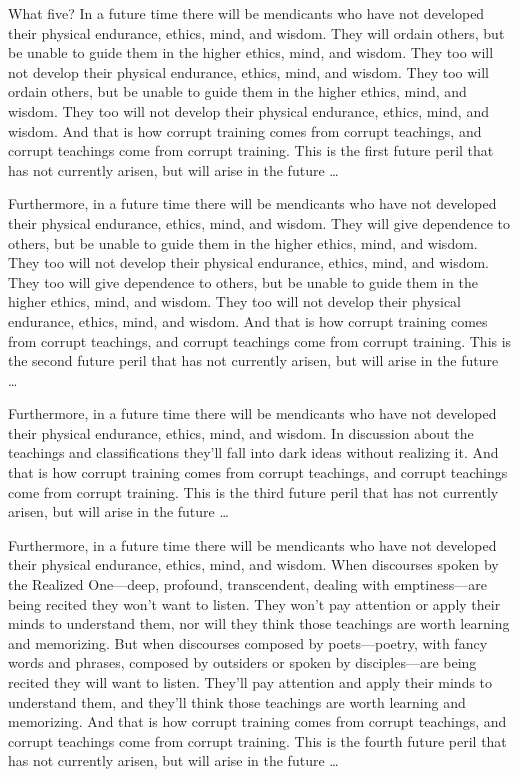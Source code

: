 \documentclass[12pt,openany]{book}%
\begin{document}
What five? In a future time there will be mendicants who have not developed their physical endurance, ethics, mind, and wisdom. They will ordain others, but be unable to guide them in the higher ethics, mind, and wisdom. They too will not develop their physical endurance, ethics, mind, and wisdom. They too will ordain others, but be unable to guide them in the higher ethics, mind, and wisdom. They too will not develop their physical endurance, ethics, mind, and wisdom. And that is how corrupt training comes from corrupt teachings, and corrupt teachings come from corrupt training. This is the first future peril that has not currently arisen, but will arise in the future … 

Furthermore, in a future time there will be mendicants who have not developed their physical endurance, ethics, mind, and wisdom. They will give dependence to others, but be unable to guide them in the higher ethics, mind, and wisdom. They too will not develop their physical endurance, ethics, mind, and wisdom. They too will give dependence to others, but be unable to guide them in the higher ethics, mind, and wisdom. They too will not develop their physical endurance, ethics, mind, and wisdom. And that is how corrupt training comes from corrupt teachings, and corrupt teachings come from corrupt training. This is the second future peril that has not currently arisen, but will arise in the future … 

Furthermore, in a future time there will be mendicants who have not developed their physical endurance, ethics, mind, and wisdom. In discussion about the teachings and classifications they’ll fall into dark ideas without realizing it. And that is how corrupt training comes from corrupt teachings, and corrupt teachings come from corrupt training. This is the third future peril that has not currently arisen, but will arise in the future … 

Furthermore, in a future time there will be mendicants who have not developed their physical endurance, ethics, mind, and wisdom. When discourses spoken by the Realized One—deep, profound, transcendent, dealing with emptiness—are being recited they won’t want to listen. They won’t pay attention or apply their minds to understand them, nor will they think those teachings are worth learning and memorizing. But when discourses composed by poets—poetry, with fancy words and phrases, composed by outsiders or spoken by disciples—are being recited they will want to listen. They’ll pay attention and apply their minds to understand them, and they’ll think those teachings are worth learning and memorizing. And that is how corrupt training comes from corrupt teachings, and corrupt teachings come from corrupt training. This is the fourth future peril that has not currently arisen, but will arise in the future … 
\end{document}
